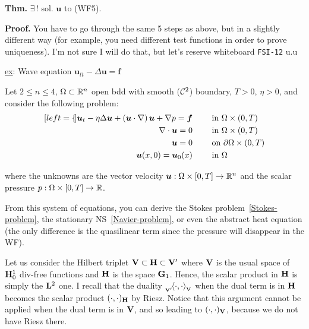 \textbf{Thm.} $\exists\,!$ sol. $\bm u$ to (WF5).

\smallskip

\textbf{\color{lavender(floral)}Proof.} You have to go through the same 5 steps as above, but in a slightly different way (for example, you need different test functions in order to prove uniqueness). I'm not sure I will do that, but let's reserve whiteboard \texttt{FSI-12} u.u

\smallskip

\underline{ex}: Wave equation $\bm u_{tt}-\Delta\bm u=\bm f$

\noindent\rlap{\rule[1.5ex]{0.495\textwidth}{.2pt}}

\newpage


Let $2\leq n \leq 4$, $\Omega\subset\mathbb{R}^n$ open bdd with smooth ($\mathcal{C}^2$) boundary, $T>0$, $\eta>0$, and consider the following problem:
\begin{subequations}
    \label{Navier-Stokes-problem}
    \begin{align}[left=\empheqlbrace]
    \bm u_t-\eta\Delta \bm u+ \left( \bm u\cdot\nabla \right) \bm u +\nabla p = \bm f &\qquad\text{ in }\Omega\times(0,T)  \label{eq:nsp1} \\
    \nabla\cdot \bm u=0 &\qquad\text{ in }\Omega\times(0,T) \label{eq:nsp2} \\
    \bm u=0 &\qquad\text{ on }\partial\Omega\times(0,T) \label{eq:nsp3} \\
    \bm u(x,0)=\bm u_0(x) &\qquad\text{ in }\Omega\label{eq:nsp4}
    \end{align}
\end{subequations}

where the unknowns are the vector velocity $\bm u:\Omega\times[0,T]\to\mathbb{R}^n$ and the scalar pressure $p:\Omega\times[0,T]\to\mathbb{R}$.

\smallskip

From this system of equations, you can derive the Stokes problem~\eqref{Stokes-problem}, the stationary NS~\eqref{Navier-problem}, or even the abstract heat equation (the only difference is the quasilinear term since the pressure will disappear in the WF).

\noindent\rlap{\rule[1.5ex]{0.495\textwidth}{.2pt}}


Let us consider the Hilbert triplet $\mathbf{V}\subset\mathbf{H}\subset\mathbf{V}'$ where $\mathbf{V}$ is the usual space of $\mathbf{H}_0^1$ div-free functions and $\mathbf{H}$ is the space $\mathbf{G}_1$. Hence, the scalar product in $\mathbf{H}$ is simply the $\mathbf{L}^2$ one. I recall that the duality ${}_{_{\mathbf{V}'}}\!\langle \cdot,\cdot \rangle{}_{_{\mathbf{V}}}$ when the dual term is in $\mathbf{H}$ becomes the scalar product $(\cdot,\cdot)_{\mathbf{H}}$ by Riesz. Notice that this argument cannot be applied when the dual term is in $\mathbf{V}$, and so leading to $(\cdot,\cdot)_{\mathbf{V}}$, because we do not have Riesz there.

